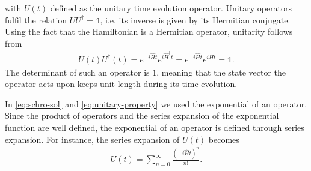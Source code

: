 with $U(t)$ defined as the unitary time evolution operator. Unitary operators fulfil the relation $UU^\dagger=\mathds{1}$, i.e.
its inverse is given by its Hermitian conjugate. Using the fact that the Hamiltonian is a Hermitian operator, unitarity follows from 
\begin{align}\label{eq:unitary-property}
    U(t)U^\dagger(t) = e^{-i\hat{H}t}e^{i\hat{H}^\dagger t} = e^{-i\hat{H}t}e^{i\hat{H}t} = \mathds{1}.
\end{align}
The determinant of such an operator is $1$, meaning that
the state vector the operator acts upon keeps unit length during its time evolution.
\par
In \cref{eq:schro-sol} and \cref{eq:unitary-property} we used the exponential of an operator. Since the
product of operators and
the series expansion of the exponential function are well defined, the exponential of an operator is defined through series expansion.
For instance, the series expansion of $U(t)$ becomes
\begin{align}\label{eq:matrix-exp}
    U(t) = \sum\limits_{n=0}^\infty \frac{(-i\hat{H}t)^n}{n!}.
\end{align}

